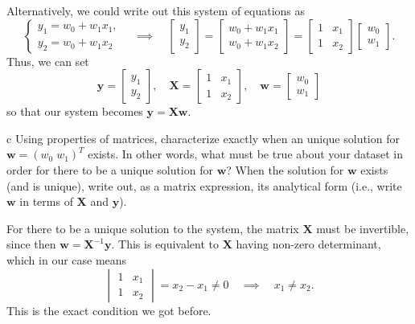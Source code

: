 \documentclass[expanded]{lkx_pset}
\begin{document}
\begin{parts}
  Alternatively, we could write out this system of equations as
  \[
    \begin{cases}
      y_1 = w_0 + w_1 x_1,\\ y_2 = w_0 + w_1 x_2
    \end{cases}\quad \implies\quad \begin{bmatrix}y_1\\y_2\end{bmatrix} = \begin{bmatrix} w_0 + w_1x_1\\ w_0 + w_1 x_2\end{bmatrix} = \begin{bmatrix}1&x_1\\1&x_2\end{bmatrix}\begin{bmatrix}w_0\\w_1\end{bmatrix}.
  \]
  Thus, we can set
  \[
    \mathbf{y}=\begin{bmatrix}y_1\\y_2\end{bmatrix},\quad \mathbf{X}=\begin{bmatrix}1&x_1\\1&x_2\end{bmatrix}, \quad \mathbf{w}=\begin{bmatrix}w_0\\w_1\end{bmatrix}
  \]
  so that our system becomes $\mathbf{y}=\mathbf{X}\mathbf{w}$.

  \begin{part}{c}
    Using properties of matrices, characterize exactly when an unique solution for  $\mathbf{w}=\left(w_0 \; w_1 \right)^{T}$ exists. In other words, what must be true about your dataset in order for there to be a unique solution for $\mathbf{w}$? When the solution for $\mathbf{w}$ exists (and is unique), write out, as a matrix expression, its analytical form (i.e., write $\mathbf{w}$ in terms of $\mathbf{X}$ and $\mathbf{y}$).
  \end{part}

  For there to be a unique solution to the system, the matrix $\mathbf{X}$ must be invertible, since then $\mathbf{w} = \mathbf{X}^{-1}\mathbf{y}$. This is equivalent to $\mathbf{X}$ having non-zero determinant, which in our case means
  \[
    \begin{vmatrix}1&x_1\\1&x_2\end{vmatrix}=x_2 - x_1\neq 0 \quad\implies\quad x_1\neq x_2.
  \]
  This is the exact condition we got before.


\end{parts}
\end{document}
